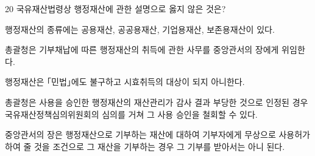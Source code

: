 \begin{question}{20}
국유재산법령상 행정재산에 관한 설명으로 옳지 않은 것은?
\begin{choices}
  \item 행정재산의 종류에는 공용재산, 공공용재산, 기업용재산, 보존용재산이 있다.
  \item 총괄청은 기부채납에 따른 행정재산의 취득에 관한 사무를 중앙관서의 장에게 위임한다.
  \item 행정재산은 ｢민법｣에도 불구하고 시효취득의 대상이 되지 아니한다.
  \item 총괄청은 사용을 승인한 행정재산의 재산관리가 감사 결과 부당한 것으로 인정된 경우 국유재산정책심의위원회의 심의를 거쳐 그 사용 승인을 철회할 수 있다.
  \item 중앙관서의 장은 행정재산으로 기부하는 재산에 대하여 기부자에게 무상으로 사용허가하여 줄 것을 조건으로 그 재산을 기부하는 경우 그 기부를 받아서는 아니 된다.
\end{choices}
\end{question}
